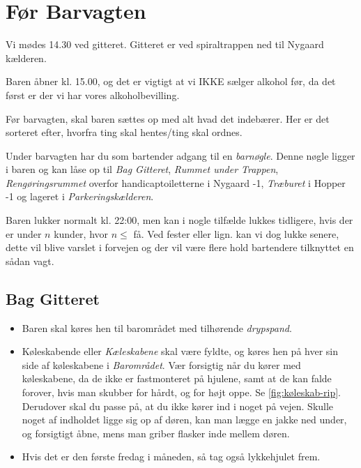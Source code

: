 \section{Før Barvagten}
\label{sec:pre-barvagten}

Vi mødes 14.30 ved gitteret. Gitteret er ved spiraltrappen ned til Nygaard kælderen.

Baren åbner kl. 15.00, og det er vigtigt
at vi IKKE sælger alkohol før, da det først er der vi har vores alkoholbevilling.

Før barvagten, skal baren sættes op med alt hvad det indebærer. Her er
det sorteret efter, hvorfra ting skal hentes/ting skal ordnes.

Under barvagten har du som bartender adgang til en \textit{barnøgle}.
Denne nøgle ligger i baren og kan låse op til \textit{Bag Gitteret},
\textit{Rummet under Trappen}, 
\textit{Rengøringsrummet} overfor handicaptoiletterne i Nygaard -1,
\textit{Træburet} i Hopper -1
og lageret i \textit{Parkeringskælderen}.

Baren lukker normalt kl. 22:00, men kan i nogle tilfælde lukkes tidligere, hvis der er under
$n$ kunder, hvor $n \le$ få. 
Ved fester eller lign. kan vi dog lukke senere, dette vil blive varslet i forvejen og der vil
være flere hold bartendere tilknyttet en sådan vagt.

\subsection{Bag Gitteret}
\label{sec:pre:bag-ved-gitteret}

\begin{itemize}
	\item Baren skal køres hen til barområdet med tilhørende \textit{drypspand}.
	\item Køleskabende eller \textit{Kæleskabene} skal være fyldte, og køres hen på hver sin side af køleskabene i
	\textit{Barområdet}. Vær forsigtig når du kører med køleskabene, da de ikke er fastmonteret på hjulene,
	samt at de kan falde forover, hvis man skubber for hårdt, og for højt oppe. Se \autoref{fig:køleskab-rip}. Derudover skal
	du passe på, at du ikke kører ind i noget på vejen. Skulle noget af indholdet ligge sig op af døren, kan man lægge en jakke
	ned under, og forsigtigt åbne, mens man griber flasker inde mellem døren.
	\item Hvis det er den første fredag i måneden, så tag også lykkehjulet frem.
\end{itemize}


